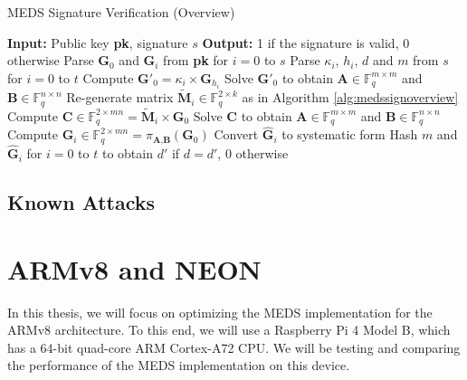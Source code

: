 \documentclass[11pt,a4paper]{report}
\theoremstyle{definition}
\begin{document}
\begin{algorithm}
  \caption{MEDS Signature Verification (Overview)}
  \label{alg:medsverifyoverview}
  \begin{algorithmic}[1]
    \State \textbf{Input:} Public key \textbf{pk}, signature $s$
    \State \textbf{Output:} 1 if the signature is valid, 0 otherwise
    \State Parse $\textbf{G}_0$ and $\textbf{G}_i$ from \textbf{pk} for $i = 0$ to $s$
    \State Parse $\kappa_i$, $h_i$, $d$ and $m$ from $s$ for $i = 0$ to $t$
        \State Compute $\textbf{G}'_{0} = \kappa_i \times \textbf{G}_{h_i}$
        \State Solve $\textbf{G}'_{0}$ to obtain $\textbf{A} \in \mathbb{F}_q^{m \times m}$ and $\textbf{B} \in \mathbb{F}_q^{n \times n}$
      \Else
        \State Re-generate matrix $\tilde{\textbf{M}}_i \in \mathbb{F}_q^{2 \times k}$ as in Algorithm \ref{alg:medssignoverview}
        \State Compute $\textbf{C} \in \mathbb{F}_q^{2 \times mn} = \tilde{\textbf{M}}_i \times \textbf{G}_0$
        \State Solve $\textbf{C}$ to obtain $\textbf{A} \in \mathbb{F}_q^{m \times m}$ and $\textbf{B} \in \mathbb{F}_q^{n \times n}$
      \EndIf
      \State Compute $\hat{\textbf{G}}_i \in \mathbb{F}_q^{2 \times mn} = \pi_{\textbf{A}, \textbf{B}}(\textbf{G}_0)$
      \State Convert $\hat{\textbf{G}}_i$ to systematic form
    \EndFor
    \State Hash $m$ and $\hat{\textbf{G}}_i$ for $i = 0$ to $t$ to obtain $d'$
    \State {} if $d = d'$, 0 otherwise
  \end{algorithmic}
\end{algorithm}

\subsection{Known Attacks}

\section{ARMv8 and NEON}
\label{sec:armv8}
In this thesis, we will focus on optimizing the MEDS implementation for the ARMv8 architecture. To this end, we will use a Raspberry Pi 4 Model B, which has a 64-bit quad-core ARM Cortex-A72 CPU. We will be testing and comparing the performance of the MEDS implementation on this device.
\end{document}
